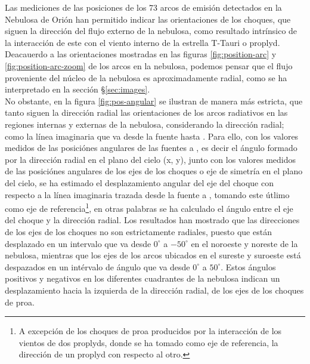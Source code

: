 Las mediciones de las posiciones de los 73 arcos de emisión detectados en la Nebulosa de Orión han permitido indicar las orientaciones de los choques, que siguen la dirección del flujo externo de la nebulosa, como resultado intrínsico de la interacción de este con el viento interno de la estrella T-Tauri o proplyd. Deacauerdo a las orientaciones mostradas en las  figuras \ref{fig:position-arc} y \ref{fig:position-arc-zoom} de los arcos en la nebulosa, podemos pensar que el flujo proveniente del núcleo de la nebulosa es aproximadamente radial, como se ha interpretado en la sección \S\ref{sec:images}.\\

 No obstante, en la figura \ref{fig:pos-angular} se ilustran de manera más estricta, que tanto siguen la dirección radial las orientaciones de los arcos radiativos en las regiones internas y externas  de la nebulosa, considerando la dirección radial; como la línea imaginaria que va desde la fuente hasta \thC{}. Para ello, con los valores medidos de las posiciónes angulares de las fuentes a \thC{}, es decir el ángulo formado por la dirección radial en el plano del cielo (x, y), junto con los valores medidos de las posiciónes angulares de los ejes de los choques o eje de simetría en el plano del cielo, se ha estimado el desplazamiento angular del eje del choque con respecto a la línea imaginaria trazada desde la fuente a \thC{}, tomando este útlimo como eje de referencia\footnote{A excepción de los choques de proa producidos por  la interacción de los vientos de dos proplyds, donde se ha tomado como eje de referencia, la dirección de un proplyd con respecto al otro.}, en otras palabras se ha calculado el ángulo entre el eje del choque y la dirección radial. Los resultados han mostrado que las direcciones de los ejes de los choques no son estrictamente radiales, puesto que están desplazado en un intervalo  que va desde \(0^{\circ}\) a \(-50^{\circ}\) en el noroeste y noreste de la nebulosa, mientras que los ejes de los arcos ubicados en el sureste y suroeste está despazados en un intérvalo de ángulo que va desde \(0^{\circ}\) a \(50^{\circ}\). Estos ángulos positivos y negativos en los diferentes cuadrantes de la nebulosa indican un desplazamiento hacia la izquierda de la dirección radial, de los ejes de los choques de proa. \\

